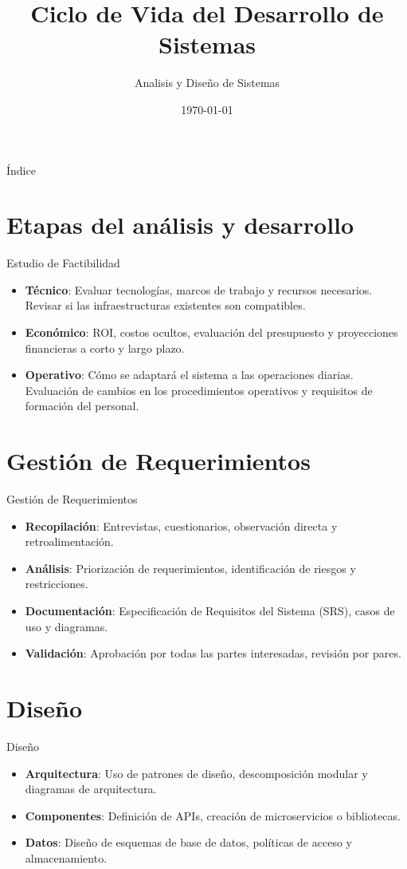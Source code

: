 \documentclass[aspectratio=169]{beamer}
\title{Ciclo de Vida del Desarrollo de Sistemas}
\author{Analisis y Diseño de Sistemas}
\date{\today}
\begin{document}
\begin{frame}
    \titlepage
\end{frame}

\begin{frame}{Índice}
    \tableofcontents
\end{frame}

\section{Etapas del análisis y desarrollo}
\begin{frame}{Estudio de Factibilidad}
    \begin{itemize}
        \item \textbf{Técnico}: Evaluar tecnologías, marcos de trabajo y recursos necesarios. Revisar si las infraestructuras existentes son compatibles.
        \item \textbf{Económico}: ROI, costos ocultos, evaluación del presupuesto y proyecciones financieras a corto y largo plazo.
        \item \textbf{Operativo}: Cómo se adaptará el sistema a las operaciones diarias. Evaluación de cambios en los procedimientos operativos y requisitos de formación del personal.
    \end{itemize}
\end{frame}

\section{Gestión de Requerimientos}
\begin{frame}{Gestión de Requerimientos}
    \begin{itemize}
        \item \textbf{Recopilación}: Entrevistas, cuestionarios, observación directa y retroalimentación.
        \item \textbf{Análisis}: Priorización de requerimientos, identificación de riesgos y restricciones.
        \item \textbf{Documentación}: Especificación de Requisitos del Sistema (SRS), casos de uso y diagramas.
        \item \textbf{Validación}: Aprobación por todas las partes interesadas, revisión por pares.
    \end{itemize}
\end{frame}

\section{Diseño}
\begin{frame}{Diseño}
    \begin{itemize}
        \item \textbf{Arquitectura}: Uso de patrones de diseño, descomposición modular y diagramas de arquitectura.
        \item \textbf{Componentes}: Definición de APIs, creación de microservicios o bibliotecas.
        \item \textbf{Datos}: Diseño de esquemas de base de datos, políticas de acceso y almacenamiento.
    \end{itemize}
\end{frame}
\end{document}

